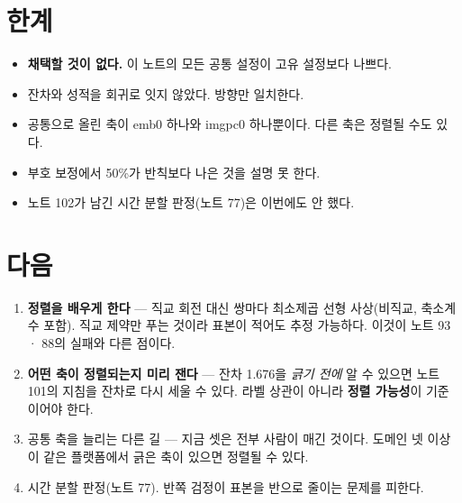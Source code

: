 \documentclass[10pt]{article}
\begin{document}

\section{한계}

\begin{itemize}[leftmargin=1.1em,itemsep=0.15em]
\item \textbf{채택할 것이 없다.} 이 노트의 모든 공통 설정이 고유 설정보다
      나쁘다.
\item 잔차와 성적을 회귀로 잇지 않았다. 방향만 일치한다.
\item 공통으로 올린 축이 emb0 하나와 imgpc0 하나뿐이다. 다른 축은 정렬될
      수도 있다.
\item 부호 보정에서 50\%가 반칙보다 나은 것을 설명 못 한다.
\item 노트 102가 남긴 시간 분할 판정(노트 77)은 이번에도 안 했다.
\end{itemize}

\section{다음}

\begin{enumerate}[leftmargin=1.3em,itemsep=0.15em]
\item \textbf{정렬을 배우게 한다} --- 직교 회전 대신 쌍마다 최소제곱 선형
      사상(비직교, 축소계수 포함). 직교 제약만 푸는 것이라 표본이 적어도
      추정 가능하다. 이것이 노트 93 · 88의 실패와 다른 점이다.
\item \textbf{어떤 축이 정렬되는지 미리 잰다} --- 잔차 1.676을 \emph{긁기 전에}
      알 수 있으면 노트 101의 지침을 잔차로 다시 세울 수 있다. 라벨 상관이
      아니라 \textbf{정렬 가능성}이 기준이어야 한다.
\item 공통 축을 늘리는 다른 길 --- 지금 셋은 전부 사람이 매긴 것이다.
      도메인 넷 이상이 같은 플랫폼에서 긁은 축이 있으면 정렬될 수 있다.
\item 시간 분할 판정(노트 77). 반쪽 검정이 표본을 반으로 줄이는 문제를 피한다.
\end{enumerate}
\end{document}
